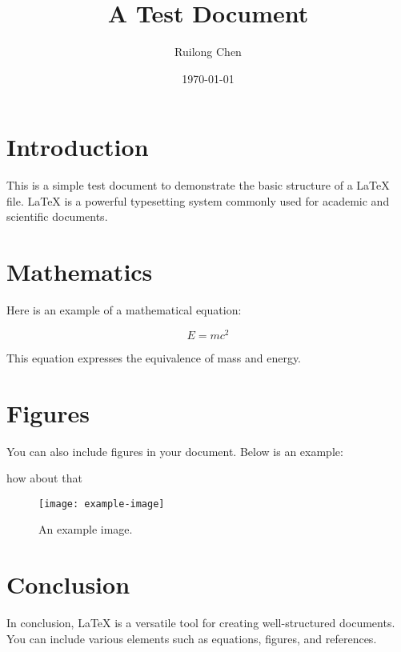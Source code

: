 \documentclass{article}
\title{A Test Document}
\author{Ruilong Chen}
\date{\today}
\begin{document}
\maketitle

\section{Introduction}

This is a simple test document to demonstrate the basic structure of a LaTeX file. LaTeX is a powerful typesetting system commonly used for academic and scientific documents.

\section{Mathematics}

Here is an example of a mathematical equation:

\begin{equation}
E = mc^2
\end{equation}

This equation expresses the equivalence of mass and energy.

\section{Figures}

You can also include figures in your document. Below is an example:
 
how about that

\begin{figure}[h]
    \centering
    \texttt{[image: example-image]} %
    \caption{An example image.}
    \label{fig:example}
\end{figure}

\section{Conclusion}

In conclusion, LaTeX is a versatile tool for creating well-structured documents. You can include various elements such as equations, figures, and references.
\end{document}
